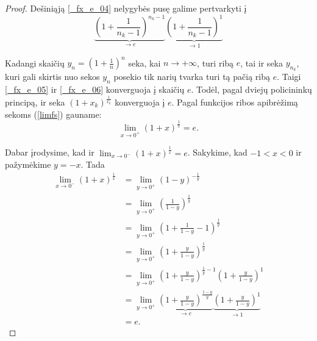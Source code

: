 \begin{exmp}
\begin{proof}
    Dešiniąją \ref{_fx_e_04} nelygybės pusę galime pertvarkyti į
    \begin{equation}
      \underbrace{\left( 1 + \frac{1}{n_{k}-1} \right)^{n_{k}-1}}_{\to e}
      \underbrace{\left( 1 + \frac{1}{n_{k}-1} \right)^{1}}_{\to 1}
      \label{_fx_e_06}
    \end{equation}

    Kadangi skaičių $y_{n} = (1 + \frac{1}{n})^n$ seka, kai 
    $n \to +\infty$, turi ribą $e$, tai ir seka $y_{n_{k}}$, kuri
    gali skirtis nuo sekos $y_{n}$ posekio tik narių tvarka turi 
    tą pačią ribą $e$. Taigi \ref{_fx_e_05} ir \ref{_fx_e_06} 
    konverguoja į skaičių $e$. Todėl, pagal dviejų policininkų
    principą, ir seka $(1 + x_{k})^{\frac{1}{x_{k}}}$ konverguoja į
    $e$. Pagal funkcijos ribos apibrėžimą sekoms (\ref{limfs})
    gauname:
    \begin{equation}
      \lim_{x \to 0^{+}} (1 + x)^{\frac{1}{x}} = e.
      \label{_fx_e_07}
    \end{equation}

    Dabar įrodysime, kad ir 
    $\lim_{x \to 0^{-}} (1 + x)^{\frac{1}{x}} = e$. Sakykime, kad
    $-1 < x < 0$ ir pažymėkime $y = -x$. Tada
    \begin{align*}
      \lim_{x \to 0^{-}} (1 + x)^{\frac{1}{x}} 
      &= \lim_{y \to 0^{+}} (1 - y)^{-\frac{1}{y}} \\
      &= \lim_{y \to 0^{+}} 
        \left( \frac{1}{1 - y} \right)^{\frac{1}{y}} \\
      &= \lim_{y \to 0^{+}} 
        \left( 1 + \frac{1}{1 - y} - 1 \right)^{\frac{1}{y}} \\
      &= \lim_{y \to 0^{+}} 
        \left( 1 + \frac{y}{1 - y} \right)^{\frac{1}{y}} \\
      &= \lim_{y \to 0^{+}} 
        \left( 1 + \frac{y}{1 - y} \right)^{\frac{1}{y} - 1}
        \left( 1 + \frac{y}{1 - y} \right)^{1} \\
      &= \lim_{y \to 0^{+}} 
        \underbrace{
          \left( 1 + \frac{y}{1 - y} \right)^{\frac{1 - y}{y}}}_{\to e}
        \underbrace{
          \left( 1 + \frac{y}{1 - y} \right)^{1}}_{\to 1} \\
      &= e.
    \end{align*}

  \end{proof}
\end{exmp}
